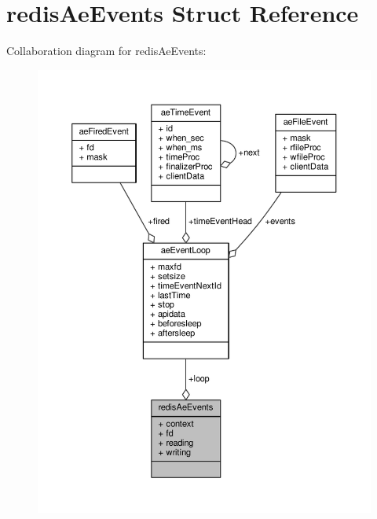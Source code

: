 \hypertarget{structredisAeEvents}{}\section{redis\+Ae\+Events Struct Reference}
\label{structredisAeEvents}


Collaboration diagram for redis\+Ae\+Events\+:\nopagebreak
\begin{figure}[H]
\begin{center}
\leavevmode
\includegraphics[width=350pt]{structredisAeEvents__coll__graph}
\end{center}
\end{figure}
